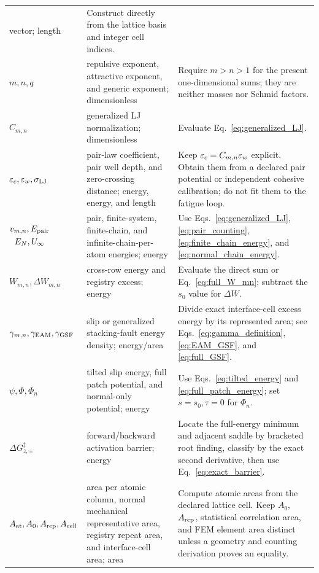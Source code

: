 \begin{longtable}{>{\raggedright\arraybackslash}p{}
                  >{\raggedright\arraybackslash}p{}
                  >{\raggedright\arraybackslash}p{}}
vector; length & Construct directly from the lattice basis and integer cell indices.\\
$m,n,q$ & repulsive exponent, attractive exponent, and generic exponent; dimensionless & Require
$m>n>1$ for the present one-dimensional sums; they are neither masses nor Schmid factors.\\
$C_{m,n}$ & generalized LJ normalization; dimensionless & Evaluate
Eq.~\eqref{eq:generalized_LJ}.\\
$\varepsilon_c,\varepsilon_w,\sigma_{\mathrm{LJ}}$ & pair-law coefficient, pair well depth, and zero-crossing distance; energy,
energy, and length & Keep $\varepsilon_c=C_{m,n}\varepsilon_w$ explicit. Obtain them from a declared pair potential
or independent cohesive calibration; do not fit them to the fatigue loop.\\
$\begin{gathered}v_{m,n},E_{\rm pair}\\E_N,U_\infty\end{gathered}$ & pair, finite-system, finite-chain, and infinite-chain-per-atom
energies; energy & Use Eqs.~\eqref{eq:generalized_LJ}, \eqref{eq:pair_counting},
\eqref{eq:finite_chain_energy}, and \eqref{eq:normal_chain_energy}.\\
$W_{m,n},\Delta W_{m,n}$ & cross-row energy and registry excess; energy & Evaluate the direct sum or
Eq.~\eqref{eq:full_W_mn}; subtract the $s_0$ value for $\Delta W$.\\
$\gamma_{m,n},\gamma_{\rm EAM},\gamma_{\rm GSF}$ & slip or generalized stacking-fault energy
density; energy/area & Divide exact interface-cell excess energy by its represented area; see
Eqs.~\eqref{eq:gamma_definition}, \eqref{eq:EAM_GSF}, and \eqref{eq:full_GSF}.\\
$\psi,\Phi,\Phi_n$ & tilted slip energy, full patch potential, and normal-only potential; energy &
Use Eqs.~\eqref{eq:tilted_energy} and \eqref{eq:full_patch_energy}; set $s=s_0,\tau=0$ for
$\Phi_n$.\\
$\Delta G_{z,\pm}^\ddagger$ & forward/backward activation barrier; energy & Locate the full-energy
minimum and adjacent saddle by bracketed root finding, classify by the exact second derivative,
then use Eq.~\eqref{eq:exact_barrier}.\\
$A_{\rm at},A_0,A_{\rm rep},A_{\rm cell}$ & area per atomic column, normal mechanical
representative area, registry repeat area, and interface-cell area; area & Compute atomic areas from
the declared lattice cell. Keep $A_0$, $A_{\rm rep}$, statistical correlation area, and FEM
element area distinct unless a geometry and counting derivation proves an equality.\\

\end{longtable}
